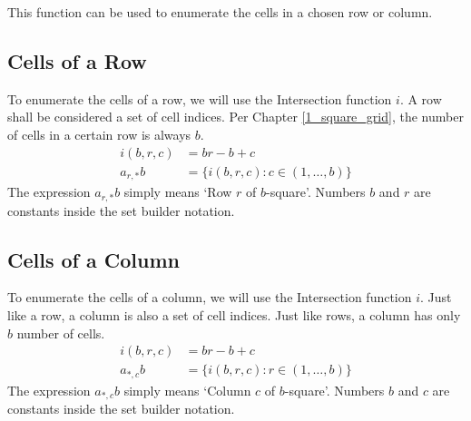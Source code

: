 \documentclass[letterpaper, twoside,12pt]{article}
\begin{document}
    This function can be used to enumerate the cells in a chosen row or column.

    \newpage

    \subsection{Cells of a Row} \label{row_cells}
    To enumerate the cells of a row, we will use the Intersection function $i$. A row shall be considered a set of cell indices. Per Chapter \ref{1_square_grid}, the number of cells in a certain row is always $b$.
    \begin{equation}
        \begin{split}
            i(b,r,c) &= br - b + c \\
            a_{r,*}b &= \{ i(b,r,c) : c \in (1, \dots, b) \}
        \end{split}
    \end{equation}
    The expression $a_{r,*}b$ simply means `Row $r$ of $b$-square'. Numbers $b$ and $r$ are constants inside the set builder notation.

    \subsection{Cells of a Column} \label{column_cells}
    To enumerate the cells of a column, we will use the Intersection function $i$. Just like a row, a column is also a set of cell indices. Just like rows, a column has only $b$ number of cells.
    \begin{equation}
        \begin{split}
            i(b,r,c) &= br - b + c \\
            a_{*,c}b &= \{ i(b,r,c) : r \in (1, \dots, b) \}
        \end{split}
    \end{equation}
    The expression $a_{*,c}b$ simply means `Column $c$ of $b$-square'. Numbers $b$ and $c$ are constants inside the set builder notation.
\end{document}
